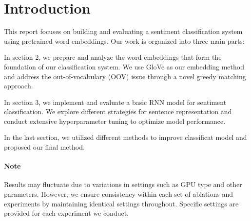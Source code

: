 \section{Introduction}
This report focuses on building and evaluating a sentiment classification system using pretrained word embeddings. Our work is organized into three main parts:

In section 2, we prepare and analyze the word embeddings that form the foundation of our classification system. We use GloVe as our embedding method and address the out-of-vocabulary (OOV) issue through a novel greedy matching approach.

In section 3, we implement and evaluate a basic RNN model for sentiment classification. We explore different strategies for sentence representation and conduct extensive hyperparameter tuning to optimize model performance.

In the last section, we utilized different methods to improve classificat model and proposed our final method.

\paragraph{Note} Results may fluctuate due to variations in settings such as GPU type and other parameters. However, we ensure consistency within each set of ablations and experiments by maintaining identical settings throughout. Specific settings are provided for each experiment we conduct.